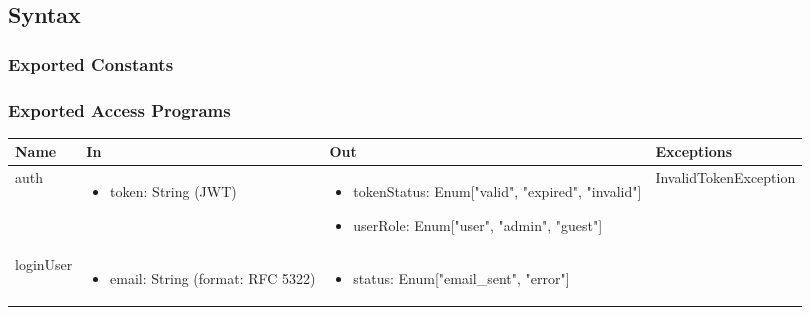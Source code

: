 \documentclass[12pt, titlepage]{article}
\begin{document}
\subsection{Syntax}

\subsubsection{Exported Constants}

\subsubsection{Exported Access Programs}

\begin{center}
  \begin{tabular}{p{2cm} p{4cm} p{2cm} p{4cm}}
  \hline
  \textbf{Name} & \textbf{In} & \textbf{Out} & \textbf{Exceptions} \\
  \hline
  auth & 
  \begin{minipage}{3.5cm}
  \vspace{-0.2cm}
  \begin{itemize}[leftmargin=*,noitemsep]
    \item token: String (JWT)
  \end{itemize}
  \end{minipage} & 
  \begin{minipage}{3.5cm}
  \vspace{-0.2cm}
  \begin{itemize}[leftmargin=*,noitemsep]
    \item tokenStatus: Enum["valid", "expired", "invalid"]
    \item userRole: Enum["user", "admin", "guest"]
  \end{itemize}
  \end{minipage} & 
  InvalidTokenException \\
  \hline
  loginUser & 
  \begin{minipage}{3.5cm}
  \vspace{-0.2cm}
  \begin{itemize}[leftmargin=*,noitemsep]
    \item email: String (format: RFC 5322)
  \end{itemize}
  \end{minipage} & 
  \begin{minipage}{3.5cm}
  \vspace{-0.2cm}
  \begin{itemize}[leftmargin=*,noitemsep]
    \item status: Enum["email\_sent", "error"]

\end{itemize}
\end{minipage}
\end{tabular}
\end{center}
\end{document}
